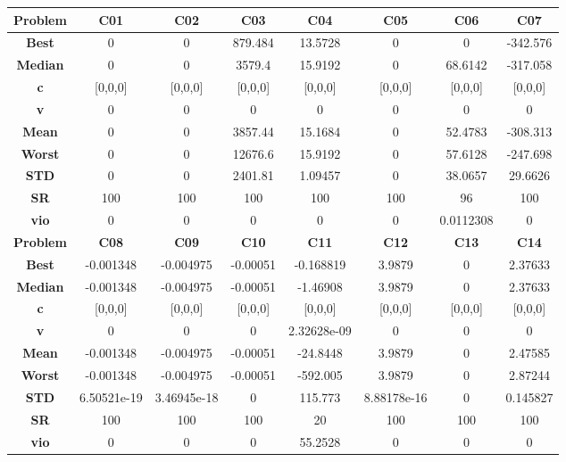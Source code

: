 \documentclass{IEEEtran}
\begin{document}
\newpage
\begin{center} 
  \begin{tabular}{|c|c|c|c|c|c|c|c|}
    \hline 
    \textbf{Problem} & \textbf{C01} & \textbf{C02} & \textbf{C03} & \textbf{C04} & \textbf{C05} & \textbf{C06} & \textbf{C07} \\ 
    \hline\hline 
    \textbf{Best} & 0 & 0 & 879.484 & 13.5728 & 0 & 0 & -342.576\\ 
    \textbf{Median} & 0 & 0 & 3579.4 & 15.9192 & 0 & 68.6142 & -317.058\\ 
    \textbf{c} & [0,0,0] & [0,0,0] & [0,0,0] & [0,0,0] & [0,0,0] & [0,0,0] & [0,0,0]\\ 
    \textbf{v} & 0 & 0 & 0 & 0 & 0 & 0 & 0\\ 
    \textbf{Mean} & 0 & 0 & 3857.44 & 15.1684 & 0 & 52.4783 & -308.313\\ 
    \textbf{Worst} & 0 & 0 & 12676.6 & 15.9192 & 0 & 57.6128 & -247.698\\ 
    \textbf{STD} & 0 & 0 & 2401.81 & 1.09457 & 0 & 38.0657 & 29.6626\\ 
    \textbf{SR} & 100 & 100 & 100 & 100 & 100 & 96 & 100\\ 
    \textbf{vio} & 0 & 0 & 0 & 0 & 0 & 0.0112308 & 0\\ 
    \hline 
    \hline 
    \textbf{Problem} & \textbf{C08} & \textbf{C09} & \textbf{C10} & \textbf{C11} & \textbf{C12} & \textbf{C13} & \textbf{C14} \\ 
    \hline\hline 
    \textbf{Best} & -0.001348 & -0.004975 & -0.00051 & -0.168819 & 3.9879 & 0 & 2.37633\\ 
    \textbf{Median} & -0.001348 & -0.004975 & -0.00051 & -1.46908 & 3.9879 & 0 & 2.37633\\ 
    \textbf{c} & [0,0,0] & [0,0,0] & [0,0,0] & [0,0,0] & [0,0,0] & [0,0,0] & [0,0,0]\\ 
    \textbf{v} & 0 & 0 & 0 & 2.32628e-09 & 0 & 0 & 0\\ 
    \textbf{Mean} & -0.001348 & -0.004975 & -0.00051 & -24.8448 & 3.9879 & 0 & 2.47585\\ 
    \textbf{Worst} & -0.001348 & -0.004975 & -0.00051 & -592.005 & 3.9879 & 0 & 2.87244\\ 
    \textbf{STD} & 6.50521e-19 & 3.46945e-18 & 0 & 115.773 & 8.88178e-16 & 0 & 0.145827\\ 
    \textbf{SR} & 100 & 100 & 100 & 20 & 100 & 100 & 100\\ 
    \textbf{vio} & 0 & 0 & 0 & 55.2528 & 0 & 0 & 0\\ 

\end{tabular}
\end{center}
\end{document}
